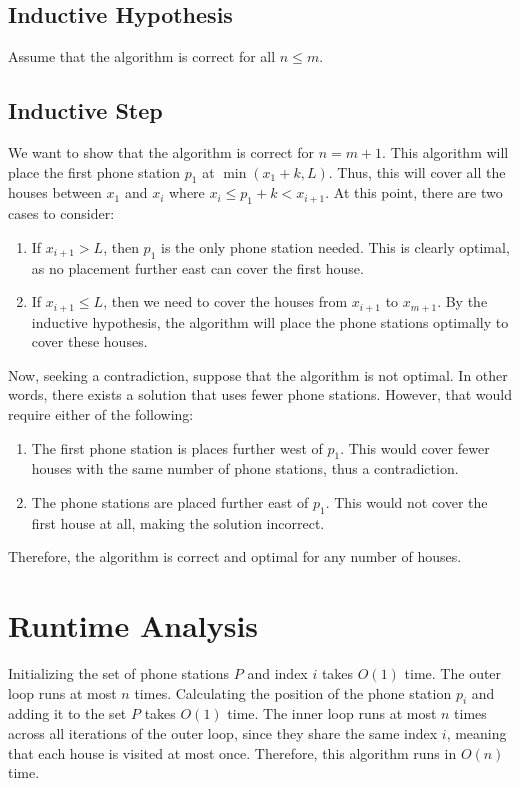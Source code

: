 \documentclass{article}
\begin{document}
\subsection{Inductive Hypothesis}
Assume that the algorithm is correct for all $n \leq m$.

\subsection{Inductive Step}
We want to show that the algorithm is correct for $n = m + 1$.
This algorithm will place the first phone station $p_1$ at $\min(x_1 + k, L)$.
Thus, this will cover all the houses between $x_1$ and $x_i$ where $x_i \leq p_1 + k < x_{i+1}$.
At this point, there are two cases to consider:
\begin{enumerate}
    \item If $x_{i+1} > L$, then $p_1$ is the only phone station needed.
    This is clearly optimal, as no placement further east can cover the first house.
    \item If $x_{i+1} \leq L$, then we need to cover the houses from $x_{i+1}$ to $x_{m+1}$.
    By the inductive hypothesis, the algorithm will place the phone stations optimally to cover these houses.
\end{enumerate}

Now, seeking a contradiction, suppose that the algorithm is not optimal.
In other words, there exists a solution that uses fewer phone stations.
However, that would require either of the following:
\begin{enumerate}
    \item The first phone station is places further west of $p_1$.
    This would cover fewer houses with the same number of phone stations, thus a contradiction.
    \item The phone stations are placed further east of $p_1$.
    This would not cover the first house at all, making the solution incorrect.
\end{enumerate}

Therefore, the algorithm is correct and optimal for any number of houses.

\section{Runtime Analysis}

Initializing the set of phone stations $P$ and index $i$ takes $O(1)$ time.
The outer loop runs at most $n$ times.
Calculating the position of the phone station $p_i$ and adding it to the set $P$ takes $O(1)$ time.
The inner loop runs at most $n$ times across all iterations of the outer loop, since they share the same index $i$, meaning that each house is visited at most once.
Therefore, this algorithm runs in $O(n)$ time.
\end{document}
